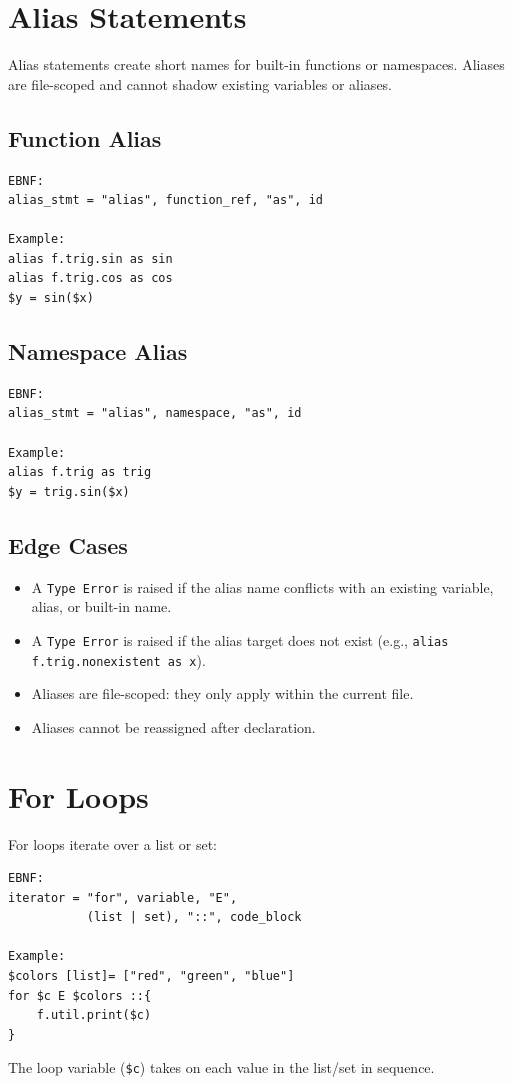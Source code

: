 \section{Alias Statements}
Alias statements create short names for built-in functions or namespaces. Aliases are file-scoped and cannot shadow existing variables or aliases.

\subsection{Function Alias}
\begin{verbatim}
EBNF:
alias_stmt = "alias", function_ref, "as", id

Example:
alias f.trig.sin as sin
alias f.trig.cos as cos
$y = sin($x)
\end{verbatim}

\subsection{Namespace Alias}
\begin{verbatim}
EBNF:
alias_stmt = "alias", namespace, "as", id

Example:
alias f.trig as trig
$y = trig.sin($x)
\end{verbatim}

\subsection{Edge Cases}
\begin{itemize}
\item A \texttt{Type Error} is raised if the alias name conflicts with an existing variable, alias, or built-in name.
\item A \texttt{Type Error} is raised if the alias target does not exist (e.g., \texttt{alias f.trig.nonexistent as x}).
\item Aliases are file-scoped: they only apply within the current file.
\item Aliases cannot be reassigned after declaration.
\end{itemize}

\section{For Loops}
For loops iterate over a list or set:
\begin{verbatim}
EBNF:
iterator = "for", variable, "E", 
           (list | set), "::", code_block

Example:
$colors [list]= ["red", "green", "blue"]
for $c E $colors ::{
    f.util.print($c)
}
\end{verbatim}
The loop variable (\texttt{\$c}) takes on each value in the list/set in sequence.

